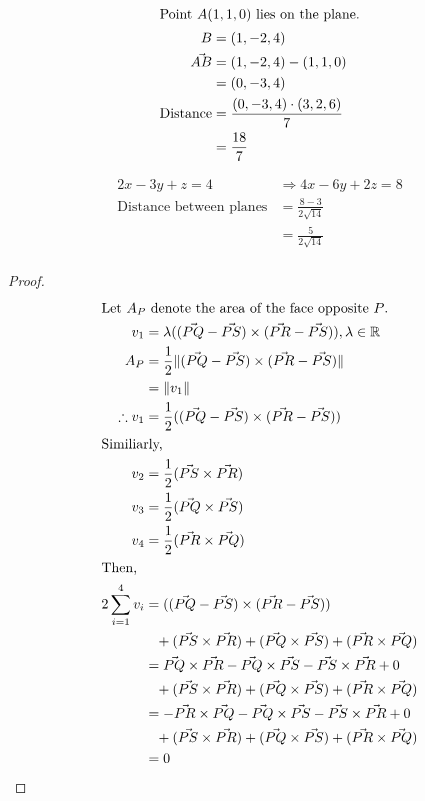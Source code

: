 \documentclass[12pt]{article}
\newenvironment{problem}[2][Problem]{\begin{trivlist}
\item[\hskip \labelsep {\bfseries #1}\hskip \labelsep {\bfseries #2.}]}{\end{trivlist}}
\begin{document}
\begin{problem}{7}
\end{problem}
\begin{align*}
\intertext{Point $A (1,1,0)$ lies on the plane.}
B &= (1,-2,4) \\
\vec{AB} &= (1,-2,4) - (1,1,0) \\
&= (0,-3,4) \\
\text{Distance} &= \frac{(0,-3,4) \cdot (3,2,6)}{7} \\
&= \frac{18}{7}
\end{align*}
\filbreak

\begin{problem}{8}
\end{problem}
\begin{align*}
2x -3y +z = 4 &\Rightarrow 4x -6y +2z = 8 \\
\text{Distance between planes} &= \frac{8-3}{2\sqrt{14}} \\
&= \frac{5}{2\sqrt{14}} \\
\end{align*}
\filbreak

\begin{problem}{9}
\end{problem}
\begin{proof}
\begin{align*}
\intertext{Let $A_P$ denote the area of the face opposite $P$.}
v_1 &= \lambda ((\vec{PQ} - \vec{PS}) \times (\vec{PR} - \vec{PS})) 
, \lambda \in \mathbb{R} \\
A_P &= \frac{1}{2} \lVert (\vec{PQ} - \vec{PS}) \times (\vec{PR} - \vec{PS}) \rVert \\
&= \lVert v_1 \rVert \\
\therefore v_1 &= \frac{1}{2} ((\vec{PQ} - \vec{PS}) \times (\vec{PR} - \vec{PS})) \\
\shortintertext{Similiarly,}
v_2 &= \frac{1}{2} (\vec{PS} \times \vec{PR}) \\
v_3 &= \frac{1}{2} (\vec{PQ} \times \vec{PS}) \\
v_4 &= \frac{1}{2} (\vec{PR} \times \vec{PQ}) \\
\shortintertext{Then,}
2\sum_{i=1}^{4} v_i &= 
((\vec{PQ} - \vec{PS}) \times (\vec{PR} - \vec{PS})) \\
&\phantom{=}+ (\vec{PS} \times \vec{PR}) 
+ (\vec{PQ} \times \vec{PS})
+ (\vec{PR} \times \vec{PQ}) \\
&= 
\vec{PQ} \times \vec{PR} - \vec{PQ} \times \vec{PS} - \vec{PS} \times \vec{PR} + 0 \\
&\phantom{=}+ (\vec{PS} \times \vec{PR}) 
+ (\vec{PQ} \times \vec{PS})
+ (\vec{PR} \times \vec{PQ}) \\
&= 
- \vec{PR} \times \vec{PQ} - \vec{PQ} \times \vec{PS} - \vec{PS} \times \vec{PR} + 0 \\
&\phantom{=}+ (\vec{PS} \times \vec{PR}) 
+ (\vec{PQ} \times \vec{PS})
+ (\vec{PR} \times \vec{PQ}) \\
&= 0
\end{align*}
\end{proof}
\filbreak
\end{document}
